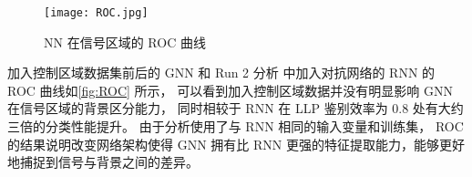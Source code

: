 \begin{figure}[ht]
    \centering
    \texttt{[image: ROC.jpg]}
    \caption{NN 在信号区域的 ROC 曲线}
    \label{fig:ROC}
\end{figure}

加入控制区域数据集前后的 GNN 和 Run 2 分析\cite{ATLAS:2022zhj} 中加入对抗网络的 RNN 的 ROC 曲线如\autoref{fig:ROC} 所示，
可以看到加入控制区域数据并没有明显影响 GNN 在信号区域的背景区分能力，
同时相较于 RNN 在 LLP 鉴别效率为 0.8 处有大约三倍的分类性能提升。
由于分析使用了与 RNN 相同的输入变量和训练集，
ROC 的结果说明改变网络架构使得 GNN 拥有比 RNN 更强的特征提取能力，能够更好地捕捉到信号与背景之间的差异。
